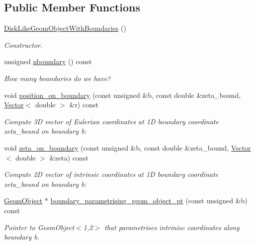 \subsection*{Public Member Functions}
\begin{DoxyCompactItemize}
\item 
\hyperlink{classoomph_1_1DiskLikeGeomObjectWithBoundaries_aa37a5bca3024c20545eeba724c22053c}{Disk\+Like\+Geom\+Object\+With\+Boundaries} ()
\begin{DoxyCompactList}\small\item\em Constructor. \end{DoxyCompactList}\item 
unsigned \hyperlink{classoomph_1_1DiskLikeGeomObjectWithBoundaries_abc85fcf43c0bb0874c092431ec12209e}{nboundary} () const
\begin{DoxyCompactList}\small\item\em How many boundaries do we have? \end{DoxyCompactList}\item 
void \hyperlink{classoomph_1_1DiskLikeGeomObjectWithBoundaries_a45dd0a30f2265f97e65f1b1c4b336b2e}{position\+\_\+on\+\_\+boundary} (const unsigned \&b, const double \&zeta\+\_\+bound, \hyperlink{classoomph_1_1Vector}{Vector}$<$ double $>$ \&r) const
\begin{DoxyCompactList}\small\item\em Compute 3D vector of Eulerian coordinates at 1D boundary coordinate zeta\+\_\+bound on boundary b\+: \end{DoxyCompactList}\item 
void \hyperlink{classoomph_1_1DiskLikeGeomObjectWithBoundaries_abed6833ebbafddb809ae8d209808c904}{zeta\+\_\+on\+\_\+boundary} (const unsigned \&b, const double \&zeta\+\_\+bound, \hyperlink{classoomph_1_1Vector}{Vector}$<$ double $>$ \&zeta) const
\begin{DoxyCompactList}\small\item\em Compute 2D vector of intrinsic coordinates at 1D boundary coordinate zeta\+\_\+bound on boundary b\+: \end{DoxyCompactList}\item 
\hyperlink{classoomph_1_1GeomObject}{Geom\+Object} $\ast$ \hyperlink{classoomph_1_1DiskLikeGeomObjectWithBoundaries_a0eae8667d3d71154c6f740e3d7dac0b9}{boundary\+\_\+parametrising\+\_\+geom\+\_\+object\+\_\+pt} (const unsigned \&b) const
\begin{DoxyCompactList}\small\item\em Pointer to Geom\+Object$<$1,2$>$ that parametrises intrinisc coordinates along boundary b. \end{DoxyCompactList}\item 

\end{DoxyCompactItemize}
